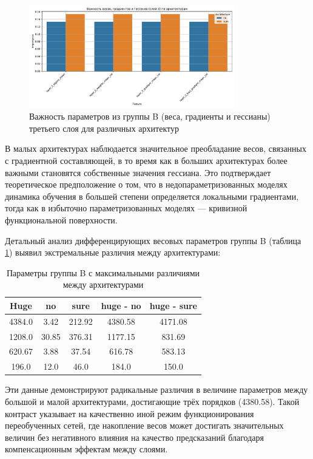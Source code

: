 \documentclass[a4paper,12pt]{article}
\begin{document}
\begin{figure}[ht]
  \centering
  \includegraphics[width=0.8\textwidth]{feature_importance_layer3.pdf}
  \caption{Важность параметров из группы B (веса, градиенты и гессианы) третьего слоя для различных архитектур}
  \label{fig:feature_importance}
\end{figure}

В малых архитектурах наблюдается значительное преобладание весов, связанных с градиентной составляющей, в то
время как в больших архитектурах более важными становятся собственные значения гессиана. Это подтверждает
теоретическое предположение о том, что в недопараметризованных моделях динамика обучения в большей степени
определяется локальными градиентами, тогда как в избыточно параметризованных моделях --- кривизной
функциональной поверхности.

Детальный анализ дифференцирующих весовых параметров группы B (таблица \ref{tab:weight_diff}) выявил
экстремальные различия между архитектурами:

\begin{table}[ht]
  \centering
  \caption{Параметры группы B с максимальными различиями между архитектурами}
  \label{tab:weight_diff}
  \begin{tabular}{|c|c|c|c|c|}
    \hline
    \textbf{Huge} & \textbf{no} & \textbf{sure} & \textbf{huge - no} & \textbf{huge - sure} \\
    \hline
    4384.0 & 3.42 & 212.92 & 4380.58 & 4171.08 \\
    1208.0 & 30.85 & 376.31 & 1177.15 & 831.69 \\
    620.67 & 3.88 & 37.54 & 616.78 & 583.13 \\
    196.0 & 12.0 & 46.0 & 184.0 & 150.0 \\
    \hline
  \end{tabular}
\end{table}

Эти данные демонстрируют радикальные различия в величине параметров между большой и малой архитектурами,
достигающие трёх порядков (4380.58). Такой контраст указывает на качественно иной режим функционирования
переобученных сетей, где накопление весов может достигать значительных величин без негативного влияния на
качество предсказаний благодаря компенсационным эффектам между слоями.
\end{document}
